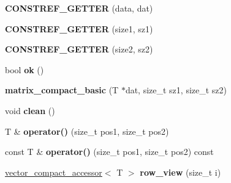 \begin{DoxyCompactItemize}
\item 
{\bfseries C\+O\+N\+S\+T\+R\+E\+F\+\_\+\+G\+E\+T\+T\+ER} (data, dat)\hypertarget{classmalgo_1_1matrix__compact__basic_a09617d0e22613534af7215e58d751b28}{}\label{classmalgo_1_1matrix__compact__basic_a09617d0e22613534af7215e58d751b28}

\item 
{\bfseries C\+O\+N\+S\+T\+R\+E\+F\+\_\+\+G\+E\+T\+T\+ER} (size1, sz1)\hypertarget{classmalgo_1_1matrix__compact__basic_a3801d93250d0337b2e3a547f60a9f824}{}\label{classmalgo_1_1matrix__compact__basic_a3801d93250d0337b2e3a547f60a9f824}

\item 
{\bfseries C\+O\+N\+S\+T\+R\+E\+F\+\_\+\+G\+E\+T\+T\+ER} (size2, sz2)\hypertarget{classmalgo_1_1matrix__compact__basic_a6154a317653fb66f44faa0a02d3a5996}{}\label{classmalgo_1_1matrix__compact__basic_a6154a317653fb66f44faa0a02d3a5996}

\item 
bool {\bfseries ok} ()\hypertarget{classmalgo_1_1matrix__compact__basic_a579887ab27c822329cc1de530601e5df}{}\label{classmalgo_1_1matrix__compact__basic_a579887ab27c822329cc1de530601e5df}

\item 
{\bfseries matrix\+\_\+compact\+\_\+basic} (T $\ast$dat, size\+\_\+t sz1, size\+\_\+t sz2)\hypertarget{classmalgo_1_1matrix__compact__basic_a867b801aa23f904307c214c93db8d018}{}\label{classmalgo_1_1matrix__compact__basic_a867b801aa23f904307c214c93db8d018}

\item 
void {\bfseries clean} ()\hypertarget{classmalgo_1_1matrix__compact__basic_a509ed4baa80359d0f66fa8c73bcc91a6}{}\label{classmalgo_1_1matrix__compact__basic_a509ed4baa80359d0f66fa8c73bcc91a6}

\item 
T \& {\bfseries operator()} (size\+\_\+t pos1, size\+\_\+t pos2)\hypertarget{classmalgo_1_1matrix__compact__basic_aacb400c2c0028b9a1eb33a3744106729}{}\label{classmalgo_1_1matrix__compact__basic_aacb400c2c0028b9a1eb33a3744106729}

\item 
const T \& {\bfseries operator()} (size\+\_\+t pos1, size\+\_\+t pos2) const \hypertarget{classmalgo_1_1matrix__compact__basic_a0816e9c0a56026c5e35a6c7558ff9d23}{}\label{classmalgo_1_1matrix__compact__basic_a0816e9c0a56026c5e35a6c7558ff9d23}

\item 
\hyperlink{classmalgo_1_1vector__compact__accessor}{vector\+\_\+compact\+\_\+accessor}$<$ T $>$ {\bfseries row\+\_\+view} (size\+\_\+t i)\hypertarget{classmalgo_1_1matrix__compact__basic_a2b95c3c6d53463a662359ba4874e2b6e}{}\label{classmalgo_1_1matrix__compact__basic_a2b95c3c6d53463a662359ba4874e2b6e}


\end{DoxyCompactItemize}
